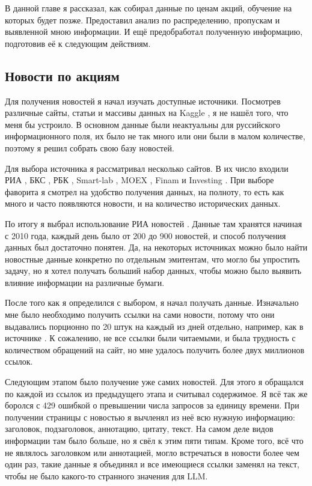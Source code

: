 \documentclass[12pt, a4paper]{article}
\begin{document}
В данной главе я рассказал, как собирал данные по ценам акций, обучение на которых будет позже. Предоставил анализ по распределению, пропускам и выявленной мною информации. И ещё предобработал полученную информацию, подготовив её к следующим действиям.

\subsection{Новости по акциям}

Для получения новостей я начал изучать доступные источники. Посмотрев различные сайты, статьи и массивы данных на Kaggle \cite{kaggle}, я не нашёл того, что меня бы устроило. В основном данные были неактуальны для руссийского информационного поля, их было не так много или они были в малом количестве, поэтому я решил собрать свою базу новостей.

Для выбора источника я рассматривал несколько сайтов. В их число входили РИА \cite{ria}, БКС \cite{bcs}, РБК \cite{rbc}, Smart-lab \cite{smartlab}, MOEX \cite{moex}, Finam \cite{finam} и Investing \cite{investing}. При выборе фаворита я смотрел на удобство получения данных, на полноту, то есть как много и часто появляются новости, и на количество исторических данных.

По итогу я выбрал использование РИА новостей \cite{ria}. Данные там хранятся начиная с 2010 года, каждый день было от 200 до 900 новостей, и способ получения данных был достаточно понятен. Да, на некоторых источниках можно было найти новостные данные конкретно по отдельным эмитентам, что могло бы упростить задачу, но я хотел получать больший набор данных, чтобы можно было выявить влияние информации на различные бумаги.

После того как я определился с выбором, я начал получать данные. Изначально мне было необходимо получить ссылки на сами новости, потому что они выдавались порционно по 20 штук на каждый из дней отдельно, например, как в источнике \cite{rialinks}. К сожалению, не все ссылки были читаемыми, и была трудность с количеством обращений на сайт, но мне удалось получить более двух миллионов ссылок.

Следующим этапом было получение уже самих новостей. Для этого я обращался по каждой из ссылок из предыдущего этапа и считывал содержимое. Я всё так же боролся с 429 ошибкой о превышении числа запросов за единицу времени. При получении страницы с новостью я вычленял из неё всю нужную информацию: заголовок, подзаголовок, аннотацию, цитату, текст. На самом деле видов информации там было больше, но я свёл к этим пяти типам. Кроме того, всё что не являлось заголовком или аннотацией, могло встречаться в новости более чем один раз, такие данные я объединял и все имеющиеся ссылки заменял на текст, чтобы не было какого-то странного значения для LLM.
\end{document}
